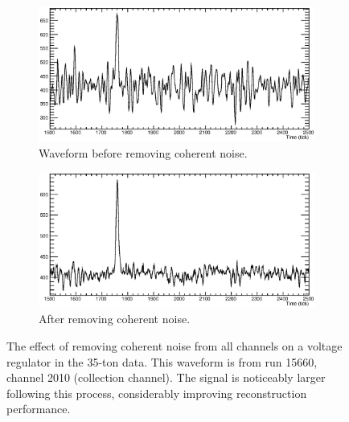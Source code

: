 \begin{figure}
  \centering
  \begin{subfigure}[t]{0.48\linewidth}
    \centering
    \includegraphics[width=\textwidth]{raw_noise.eps}
    \caption{Waveform before removing coherent noise.}
    \label{fig:CoherentNoiseRemovalNoise}
  \end{subfigure}
  \hfill
  \begin{subfigure}[t]{0.48\linewidth}
    \centering
    \includegraphics[width=\textwidth]{raw_nonoise.eps}
    \caption{After removing coherent noise.}
    \label{fig:CoherentNoiseRemovalNoNoise}
  \end{subfigure}
  \caption[The effect of removing coherent noise from all channels on a voltage regulator in the 35-ton data.]{The effect of removing coherent noise from all channels on a voltage regulator in the 35-ton data.  This waveform is from run 15660, channel 2010 (collection channel).  The signal is noticeably larger following this process, considerably improving reconstruction performance.}
  \label{fig:CoherentNoiseRemoval}
\end{figure}


